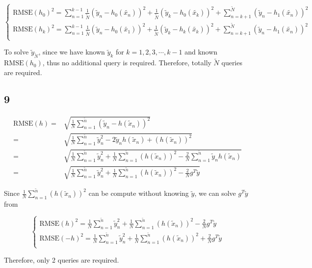 \documentclass[fleqn,a4paper,12pt]{article}
\begin{document}
\[
\begin{cases}
  \mathrm{RMSE}(h_0)^2 = \sum_{n=1}^{k-1} \frac{1}{\tilde{N}} (\tilde{y}_n - h_0(\tilde{x_n}))^2 + \frac{1}{\tilde{N}} (\tilde{y}_k - h_0(\tilde{x_k}))^2 + \sum_{n=k+1}^{\tilde{N}} (\tilde{y}_n - h_1(\tilde{x_n}))^2 \\
  \mathrm{RMSE}(h_k)^2 = \sum_{n=1}^{k-1} \frac{1}{\tilde{N}} (\tilde{y}_n - h_0(\tilde{x_1}))^2  + \frac{1}{\tilde{N}} (\tilde{y}_k - h_k(\tilde{x_k}))^2 + \sum_{n=k+1}^{\tilde{N}} (\tilde{y}_n - h_1(\tilde{x_n}))^2 \\
\end{cases}
\]


To solve $\tilde{y}_{\tilde{N}}$, since we have known $\tilde{y}_k$ for $k=1, 2, 3, \cdots, k - 1$ and known $\mathrm{RMSE}(h_0)$, thus no additional query is required. Therefore, totally $\tilde{N}$ queries are required.

\subsection*{9}

\begin{align*}
  \mathrm{RMSE}(h)
  =& \sqrt{\frac{1}{N} \sum_{n=1}^{\tilde{n}} (\tilde{y}_n - h(\tilde{x}_n))^2} \\
  =& \sqrt{\frac{1}{N} \sum_{n=1}^{\tilde{n}} \tilde{y}_n^2 - 2 \tilde{y}_n h(\tilde{x}_n) + (h(\tilde{x}_n))^2} \\
  =& \sqrt{\frac{1}{N} \sum_{n=1}^{\tilde{n}} \tilde{y}_n^2 + \frac{1}{N} \sum_{n=1}^{\tilde{n}} (h(\tilde{x}_n))^2  - \frac{2}{N} \sum_{n=1}^{\tilde{n}} \tilde{y}_n h(\tilde{x}_n) } \\
  =& \sqrt{\frac{1}{N} \sum_{n=1}^{\tilde{n}} \tilde{y}_n^2 + \frac{1}{N} \sum_{n=1}^{\tilde{n}} (h(\tilde{x}_n))^2  - \frac{2}{N} g^T \tilde{y} }
\end{align*}

Since $\frac{1}{N} \sum_{n=1}^{\tilde{n}} (h(\tilde{x}_n))^2$ can be compute without knowing $\tilde{y}$, we can solve $g^T \tilde{y}$ from 

\[
  \begin{cases}
    \mathrm{RMSE}(h)^2 = \frac{1}{N} \sum_{n=1}^{\tilde{n}} \tilde{y}_n^2 + \frac{1}{N} \sum_{n=1}^{\tilde{n}} (h(\tilde{x}_n))^2  - \frac{2}{N} g^T \tilde{y}  \\
    \mathrm{RMSE}(-h)^2 = \frac{1}{N} \sum_{n=1}^{\tilde{n}} \tilde{y}_n^2 + \frac{1}{N} \sum_{n=1}^{\tilde{n}} (h(\tilde{x}_n))^2  + \frac{2}{N} g^T \tilde{y}  \\
  \end{cases}
\]

Therefore, only 2 queries are required.
\end{document}
